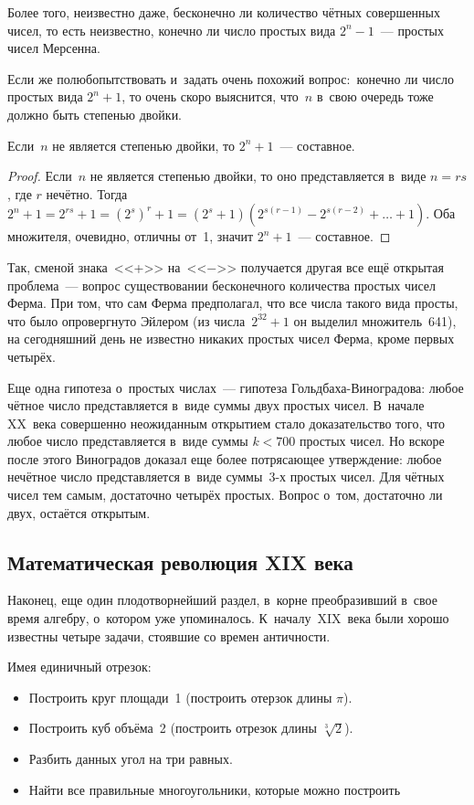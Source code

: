 \documentclass{article}
\begin{document}
Более того, неизвестно даже, бесконечно ли количество чётных совершенных чисел,
то есть неизвестно, конечно ли число простых вида $2^n - 1$~--- простых чисел
Мерсенна.

Если же полюбопытствовать и~задать очень похожий вопрос:~конечно ли число
простых вида $2^n + 1$, то очень скоро выяснится, что~$n$ в~свою очередь тоже
должно быть степенью двойки.

\begin{claim}
  Если~$n$ не является степенью двойки, то $2^n + 1$~--- составное.
\end{claim}
\begin{proof}
  Если~$n$ не является степенью двойки, то оно представляется в~виде $n = rs$,
  где $r$ нечётно. Тогда~$2^n + 1 = 2^{rs} + 1 = (2^{s})^{r} + 1 =
  (2^s + 1)(2^{s(r-1)} - 2^{s(r-2)} + \ldots + 1)$. Оба множителя, очевидно,
  отличны от~1, значит $2^n + 1$~--- составное.
\end{proof}

Так, сменой знака~<<+>> на~<<$-$>> получается другая все ещё открытая
проблема~--- вопрос существовании бесконечного количества простых чисел Ферма.
При том, что сам Ферма предполагал, что все числа такого вида просты, что было
опровергнуто Эйлером (из числа~$2^{32} + 1$ он выделил множитель~641), на
сегодняшний день не известно никаких простых чисел Ферма, кроме первых четырёх.

Еще одна гипотеза о~простых числах~--- гипотеза Гольдбаха-Виноградова: любое
чётное число представляется в~виде суммы двух простых чисел. В~начале XX~века
совершенно неожиданным открытием стало доказательство того, что любое число
представляется в~виде суммы $k < 700$ простых чисел. Но вскоре после этого
Виноградов доказал еще более потрясающее утверждение: любое нечётное число
представляется в~виде суммы~3-х простых чисел. Для чётных чисел тем самым,
достаточно четырёх простых. Вопрос о~том, достаточно ли двух, остаётся открытым.

\subsection{Математическая революция XIX века}

Наконец, еще один плодотворнейший раздел, в~корне преобразивший в~свое время
алгебру, о~котором уже упоминалось. К~началу~XIX~века были хорошо известны
четыре задачи, стоявшие со времен античности.

Имея единичный отрезок:
\begin{itemize}
  \item Построить круг площади~1 (построить отерзок длины $\pi$).
  \item Построить куб объёма~2 (построить отрезок длины $\sqrt[3]2$).
  \item Разбить данных угол на три равных.
  \item Найти все правильные многоугольники, которые можно построить
\end{itemize}
\end{document}
